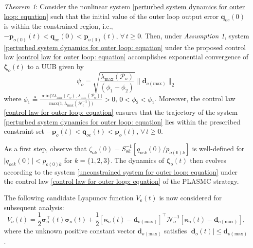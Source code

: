 \documentclass[lettersize,journal]{IEEEtran}
\begin{document}
\textit{Theorem 1}:
Consider the nonlinear system \eqref{perturbed system dynamics for outer loop: equation} such that the initial value of the outer loop output error $\boldsymbol{q}_{oe}(0)$ is within the constrained region, i.e., $- \boldsymbol{p}_{o (0)}(t) < \boldsymbol{q}_{oe}(0) < \boldsymbol{p}_{o (0)}(t), \, \forall \, t \geq 0$. Then, under \textit{Assumption 1}, system \eqref{perturbed system dynamics for outer loop: equation} under the proposed control law \eqref{control law for outer loop: equation} accomplishes exponential convergence of $\boldsymbol{\zeta}_o(t)$ to a UUB given by
\begin{equation}
    \psi_o {=} \sqrt{\frac{\lambda_{\text{max}}(\mathcal{P}_o)}{\left(\phi_1 - \phi_2\right)}} \lVert \boldsymbol{d}_{o(\text{max})} \rVert_2
\end{equation}
where $\phi_1 \triangleq \frac{\text{ min}\big(2 \lambda_{\text{min}}\left(\Gamma_o \right),\lambda_{\text{min}}\left(\mathcal{P}_o \right)\big)}{\text{max}\big(1,\lambda_{\text{max}}\left(\mathcal{N}_o^{-1} \right)\big)}>0$, $0<\phi_2<\phi_1$. Moreover, the control law \eqref{control law for outer loop: equation} ensures that the trajectory of the system \eqref{perturbed system dynamics for outer loop: equation} lies within the prescribed constraint set $- \boldsymbol{p}_{o}(t) < \boldsymbol{q}_{oe}(t) < \boldsymbol{p}_{o}(t), \, \forall \, t \geq 0$.

As a first step, observe that $\zeta_{ok}(0) = S_{ok}^{-1} [q_{oek}(0)/p_{o(0)k}]$ is well-defined for $\lvert q_{oek}(0) \rvert < p_{o(0)k}$ for $k = \{1, 2, 3\}$. The dynamics of $\boldsymbol{\zeta}_o(t)$ then evolves according to the system \eqref{unconstrained system for outer loop: equation} under the control law \eqref{control law for outer loop: equation} of the PLASMC strategy.

\noindent The following candidate Lyapunov function $V_o(t)$ is now considered for subsequent analysis:
\begin{equation} \label{Lyapunov function for outer loop: equation}
    V_o(t) = \frac{1}{2}\boldsymbol{\sigma}_o^{\top}(t)\boldsymbol{\sigma}_o(t) + \frac{1}{2} \left[\boldsymbol{\kappa}_o(t) - \boldsymbol{d}_{o(\text{max})}\right]^{\top} \mathcal{N}_o^{-1} \left[\boldsymbol{\kappa}_o(t) - \boldsymbol{d}_{o(\text{max})}\right],
\end{equation}
where the unknown positive constant vector $\boldsymbol{d}_{o(\text{max})}$ satisfies $\lvert \boldsymbol{d}_o(t) \rvert \leq \boldsymbol{d}_{o(\text{max})}$.
\end{document}
